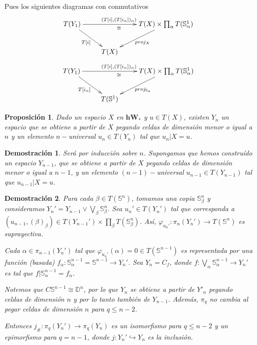 \documentclass{beamer}
\newtheorem{pro}{Proposici\'on}
\newtheorem{dem}{Demostraci\'on}
\newcommand{\W}{\mathbf{hW}}
\begin{document}
\begin{frame}
	Pues los siguientes diagramas con conmutativos
	\[\xymatrix{
		T(Y_1)\ar[rr]^{(T[i],(T[i_\alpha])_\alpha)}_\cong \ar[rd]_{T[i]} & & T(X)\times\prod_\alpha T(\mathbb{S}_\alpha^1)\ar[ld]^{proj_X} \\
		& T(X) &	
	}\]
	\[\xymatrix{
		T(Y_1)\ar[rr]^{(T[i],(T[i_\alpha])_\alpha)}_\cong \ar[rd]_{T[i_\alpha]} & & T(X)\times\prod_\alpha T(\mathbb{S}_\alpha^1)\ar[ld]^{proj_{\mathbb{S}_\alpha}} \\
		& T(\mathbb{S}^1) &	
	}\]
\end{frame}

\begin{frame}
	\begin{pro}
		Dado un espacio $X$ en $\W_\ast$ y $u\in T(X)$, existen $Y_n$ un espacio que se obtiene a partir de $X$ pegando celdas de dimensión menor o igual a $n$ y un elemento $n-$universal $u_n \in T(Y_n)$ tal que $u_n | X= u$. 
	\end{pro}
	
	\begin{dem}
		Será por inducción sobre $n$. Supongamos que hemos construído un espacio $Y_{n-1}$, que se obtiene a partir de $X$ pegando celdas de dimensión menor o igual a $n-1$, y un elemento $(n-1)-$universal $u_{n-1}\in T(Y_{n-1})$ tal que $u_{n-1}|X=u$.
	\end{dem}
\end{frame}

\begin{frame}
	\begin{dem}
		Para cada $\beta\in T(\mathbb{S}^n)$, tomamos una copia $\mathbb{S}_\beta ^n$ y consideramos $Y_n ' = Y_{n-1}\vee\bigvee_\beta \mathbb{S}_\beta^n$. Sea $u_n '\in T(Y_n ')$ tal que corresponda a $(u_{n-1},(\beta)_\beta)\in T(Y_{n-1}')\times\prod_\beta T(\mathbb{S}_\beta ^n)$. Así, $\varphi_{u_n'}\colon \pi_n(Y_n')\to T(\mathbb{S}^n)$ es suprayectiva.
		
		Cada $\alpha\in\pi_{n-1}(Y_n')$ tal que $\varphi_{u_n'}(\alpha)=0\in T(\mathbb{S}^{n-1})$ es representada por una función (basada) $f_\alpha\colon \mathbb{S}_\alpha^{n-1}=\mathbb{S}^{n-1}\to Y_n'$. Sea $Y_n=C_f$, donde $f\colon\bigvee_\alpha\mathbb{S}_\alpha^{n-1}\to Y_n'$ es tal que $f|\mathbb{S}_\alpha^{n-1}=f_\alpha$.
		
		Notemos que $C\mathbb{S}^{n-1}\cong \mathbb{D}^n$, por lo que $Y_n$ se obtiene a partir de $Y'_n$ pegando celdas de dimensión $n$ y por lo tanto también de $Y_{n-1}$. Además, $\pi_q$ no cambia al pegar celdas de dimensión $n$ para $q\leq n-2$.
		
		Entonces $j_\#\colon \pi_q(Y_n')\to \pi_q(Y_n)$ es un isomorfismo para $q\leq n-2$ y un epimorfismo para $q=n-1$, donde $j\colon Y_n' \hookrightarrow Y_n$ es la inclusión.
	\end{dem}
\end{frame}
\end{document}
